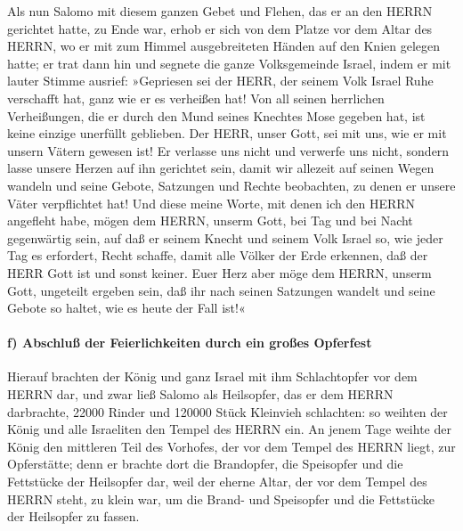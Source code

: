 Als nun Salomo mit diesem ganzen Gebet und Flehen, das er
an den HERRN gerichtet hatte, zu Ende war, erhob er sich von dem Platze
vor dem Altar des HERRN, wo er mit zum Himmel ausgebreiteten Händen auf
den Knien gelegen hatte; er trat dann hin und segnete die
ganze Volksgemeinde Israel, indem er mit lauter Stimme ausrief:
»Gepriesen sei der HERR, der seinem Volk Israel Ruhe
verschafft hat, ganz wie er es verheißen hat! Von all seinen herrlichen
Verheißungen, die er durch den Mund seines Knechtes Mose gegeben hat,
ist keine einzige unerfüllt geblieben. Der HERR, unser
Gott, sei mit uns, wie er mit unsern Vätern gewesen ist! Er verlasse uns
nicht und verwerfe uns nicht, sondern lasse unsere Herzen
auf ihn gerichtet sein, damit wir allezeit auf seinen Wegen wandeln und
seine Gebote, Satzungen und Rechte beobachten, zu denen er unsere Väter
verpflichtet hat! Und diese meine Worte, mit denen ich
den HERRN angefleht habe, mögen dem HERRN, unserm Gott, bei Tag und bei
Nacht gegenwärtig sein, auf daß er seinem Knecht und seinem Volk Israel
so, wie jeder Tag es erfordert, Recht schaffe, damit alle
Völker der Erde erkennen, daß der HERR Gott ist und sonst keiner.
Euer Herz aber möge dem HERRN, unserm Gott, ungeteilt
ergeben sein, daß ihr nach seinen Satzungen wandelt und seine Gebote so
haltet, wie es heute der Fall ist!«

\hypertarget{f-abschluuxdf-der-feierlichkeiten-durch-ein-grouxdfes-opferfest}{%
\paragraph{f) Abschluß der Feierlichkeiten durch ein großes
Opferfest}\label{f-abschluuxdf-der-feierlichkeiten-durch-ein-grouxdfes-opferfest}}

Hierauf brachten der König und ganz Israel mit ihm
Schlachtopfer vor dem HERRN dar, und zwar ließ Salomo als
Heilsopfer, das er dem HERRN darbrachte, 22000 Rinder und 120000 Stück
Kleinvieh schlachten: so weihten der König und alle Israeliten den
Tempel des HERRN ein. An jenem Tage weihte der König den
mittleren Teil des Vorhofes, der vor dem Tempel des HERRN liegt, zur
Opferstätte; denn er brachte dort die Brandopfer, die Speisopfer und die
Fettstücke der Heilsopfer dar, weil der eherne Altar, der vor dem Tempel
des HERRN steht, zu klein war, um die Brand- und Speisopfer und die
Fettstücke der Heilsopfer zu fassen.

